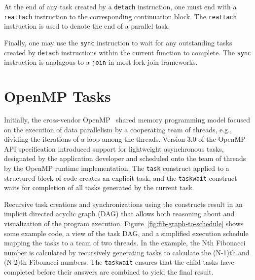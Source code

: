 \documentclass[sigconf]{acmart}
\newcommand{\figref}[1]         {Figure~\ref{fig:#1}}
\def\code{\lstinline[basicstyle=\ttfamily\color{CodeColor}]}
\begin{document}
At the end of any task created by a \code{detach} instruction, one must end with a \code{reattach} instruction to the corresponding continuation block. The \code{reattach} instruction
is used to denote the end of a parallel task.

Finally, one may use the \code{sync} instruction to wait for any outstanding tasks created
by \code{detach} instructions within the current function to complete. The \code{sync}
instruction is analagous to a \code{join} in most fork-join frameworks.


\section{OpenMP Tasks} \label{Sec:OpenMP}

Initially, the cross-vendor OpenMP~\cite{openmp} shared memory programming model 
focused on the execution of data parallelism by a cooperating team of threads, 
e.g., dividing the iterations of a loop among the threads. Version 3.0 of the 
OpenMP API specification introduced support for lightweight asynchronous tasks, 
designated by the application developer and scheduled onto the team of threads 
by the OpenMP runtime implementation.  The \texttt{task} construct applied to 
a structured block of code creates an explicit task, and the \texttt{taskwait} 
construct waits for completion of all tasks generated by the current task.

Recursive task creations and synchronizations using the constructs result in 
an implicit directed acyclic graph (DAG) that allows both reasoning about and 
visualization of the program execution.  \figref{fib-graph-to-schedule}
shows some example code, a view of the task DAG, and a simplified execution 
schedule mapping the tasks to a team of two threads.  In the example, the Nth 
Fibonacci number is calculated by recursively generating tasks to calculate 
the (N-1)th and (N-2)th Fibonacci numbers.  The \texttt{taskwait} ensures that 
the child tasks have completed before their answers are combined to yield the 
final result.
\end{document}
